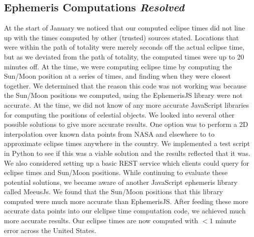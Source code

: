 \documentclass[10pt, onecolumn, draftclsnofoot, letterpaper, compsoc]{IEEEtran}
\begin{document}
\subsection{Ephemeris Computations \textit{Resolved}} \label{ephem_prob}
At the start of January we noticed that our computed eclipse
times did not line up with the times computed by other (trusted)
sources stated. Locations that were within the path of totality
were merely seconds off the actual eclipse time, but as we deviated
from the path of totality, the computed times were up to 20 minutes
off. At the time, we were computing eclipse time by computing the
Sun/Moon position at a series of times, and finding when they were
closest together. We determined that the reason this code was not
working was because the Sun/Moon positions we computed, using the
EphemerisJS library were not accurate. At the time, we did not know
of any more accurate JavaScript libraries for computing the positions
of celestial objects. We looked into several other possible solutions
to give more accurate results. One option was to perform a 2D interpolation
over known data points from NASA and elsewhere to to approximate eclipse
times anywhere in the country. We implemented a test script in Python to
see if this was a viable solution and the results reflected that it was.
We also considered setting up a basic REST service which clients could
query for eclipse times and Sun/Moon positions. While continuing to evaluate
these potential solutions, we became aware of another JavaScript ephemeris
library called MeeusJs. We found that the Sun/Moon positions that this library
computed were much more accurate than EphemerisJS. After feeding these more
accurate data points into our elclipse time computation code, we achieved
much more accurate results. Our eclipse times are now computed with \(< 1\)
minute error across the United States.
\end{document}
